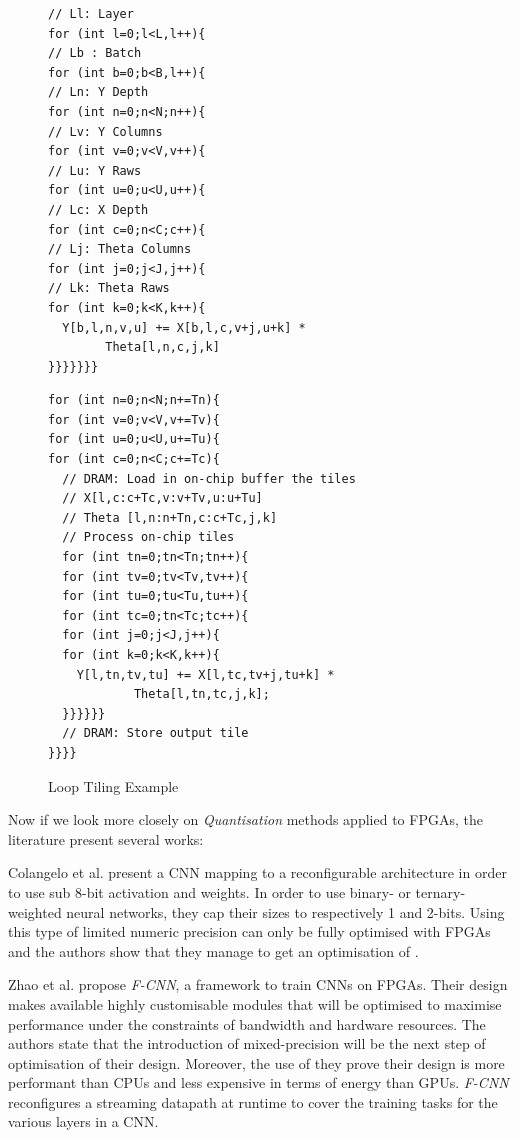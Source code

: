 \begin{figure}[htbp]
\centering
\begin{minipage}{.48\textwidth}
\begin{lstlisting}[style=CInputStyle]
// Ll: Layer
for (int l=0;l<L,l++){
// Lb : Batch
for (int b=0;b<B,l++){
// Ln: Y Depth
for (int n=0;n<N;n++){
// Lv: Y Columns
for (int v=0;v<V,v++){
// Lu: Y Raws
for (int u=0;u<U,u++){
// Lc: X Depth
for (int c=0;n<C;c++){
// Lj: Theta Columns
for (int j=0;j<J,j++){
// Lk: Theta Raws
for (int k=0;k<K,k++){
  Y[b,l,n,v,u] += X[b,l,c,v+j,u+k] *
        Theta[l,n,c,j,k]
}}}}}}}
\end{lstlisting}
\end{minipage}
\hfill
\begin{minipage}{.48\textwidth}
\begin{lstlisting}[style=CInputStyle]
for (int n=0;n<N;n+=Tn){
for (int v=0;v<V,v+=Tv){
for (int u=0;u<U,u+=Tu){
for (int c=0;n<C;c+=Tc){
  // DRAM: Load in on-chip buffer the tiles
  // X[l,c:c+Tc,v:v+Tv,u:u+Tu]
  // Theta [l,n:n+Tn,c:c+Tc,j,k]
  // Process on-chip tiles
  for (int tn=0;tn<Tn;tn++){
  for (int tv=0;tv<Tv,tv++){
  for (int tu=0;tu<Tu,tu++){
  for (int tc=0;tn<Tc;tc++){
  for (int j=0;j<J,j++){
  for (int k=0;k<K,k++){
    Y[l,tn,tv,tu] += X[l,tc,tv+j,tu+k] *
            Theta[l,tn,tc,j,k];
  }}}}}}
  // DRAM: Store output tile
}}}}
\end{lstlisting}
\end{minipage}
\caption[LoopTiling]{Loop Tiling Example \cite{Abdelouahab2018}}
	\label{fig:LoopTiling}
\end{figure}

Now if we look more closely on \emph{Quantisation} methods applied to FPGAs, the literature present several works:

Colangelo et al. \cite{Colangelo2018} present a CNN mapping to a reconfigurable architecture in order to use sub 8-bit activation and weights. In order to use binary- or ternary-weighted neural networks, they cap their sizes to respectively 1 and 2-bits. Using this type of limited numeric precision can only be fully optimised with FPGAs and the authors show that they manage to get an optimisation of .

Zhao et al. \cite{Zhao2016} propose \emph{F-CNN}, a framework to train CNNs on FPGAs. Their design makes available highly customisable modules that will be optimised to maximise performance under the constraints of bandwidth and hardware resources. The authors state that the introduction of mixed-precision will be the next step of optimisation of their design. Moreover, the use of they prove their design is more performant than CPUs and less expensive in terms of energy than GPUs. \emph{F-CNN} reconfigures a streaming datapath at runtime to cover the training tasks for the various layers in a CNN.

